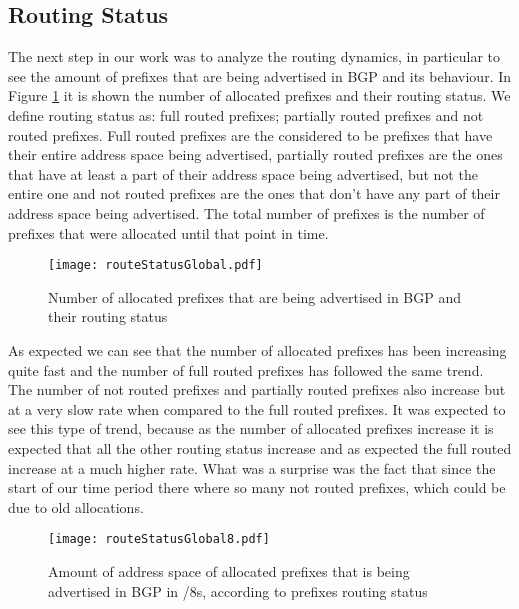 \documentclass[11pt,a4paper]{scrreprt}
\begin{document}
\subsection{Routing Status}
The next step in our work was to analyze the routing dynamics, in particular to see the amount of prefixes that are being advertised in BGP and its behaviour. 
In Figure \ref{fig:routingStatusGlobal} it is shown the number of allocated prefixes and their routing status. We define routing status as: full routed prefixes; partially routed prefixes and not routed prefixes. Full routed prefixes are the considered to be prefixes that have their entire address space being advertised, partially routed prefixes are the ones that have at least a part of their address space being advertised, but not the entire one and not routed prefixes are the ones that don't have any part of their address space being advertised. The total number of prefixes is the number of prefixes that were allocated until that point in time.

\begin{figure}[!h]
\centering
\texttt{[image: routeStatusGlobal.pdf]}
\caption{Number of allocated prefixes that are being advertised in BGP and their routing status}
\label{fig:routingStatusGlobal}
\end{figure}

As expected we can see that the number of allocated prefixes has been increasing quite fast and the number of full routed prefixes has followed the same trend. The number of not routed prefixes and partially routed prefixes also increase but at a very slow rate when compared to the full routed prefixes. It was expected to see this type of trend, because as the number of allocated prefixes increase it is expected that all the other routing status increase and as expected the full routed increase at a much higher rate. What was a surprise was the fact that since the start of our time period there where so many not routed prefixes, which could be due to old allocations.

\begin{figure}[!h]
\centering
\texttt{[image: routeStatusGlobal8.pdf]}
\caption{Amount of address space of allocated prefixes that is being advertised in BGP in /8s, according to prefixes routing status}
\label{fig:routingStatusGlobal8}
\end{figure}
\end{document}
